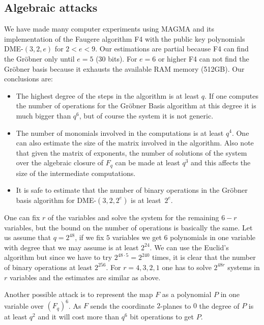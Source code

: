 \documentclass[12pt,a4paper]{amsart}
\theoremstyle{remark}
\theoremstyle{definition}
\begin{document}
\subsection*{Algebraic attacks}

We have made many computer experiments using MAGMA and its implementation of the Faugere algorithm F4 with the public key polynomials 
DME-$(3,2,e)$ for $2<e<9$. Our estimations are partial because F4 can find the Gr\"obner only until $e=5$ (30 bits). For $e=6$ or higher 
F4 can not find the Gr\"obner basis because it exhausts the available RAM memory (512GB). Our conclusions are:

\begin{itemize}
 \item The highest degree of the steps in the algorithm is at least $q$. If one computes the number of operations for 
 the Gr\"obner Basis algorithm at this degree it is much bigger than $q^6$, but of course the system it is not generic.
 \item The number of monomials involved in the computations is at least $q^4$. One can also estimate the size of the matrix involved 
 in the algorithm. Also note that given the matrix of exponents, the number of solutions of the system over the algebraic closure of 
 $F_q$ can be made at least $q^3$ and this affects the size of the intermediate computations. 
 \item It is safe to estimate that the number of binary operations in the Gr\"obner basis algorithm for DME-$(3,2,2^e)$ is at least~$2^e$. 
\end{itemize}

One can fix $r$ of the variables and solve the system for the remaining $6-r$ variables, but the bound on the number of operations is 
basically the same. Let us assume that $q=2^{48}$, if we fix $5$ variables we get 6 polynomials in one variable with degree that we may 
assume is at least $2^{24}$. We can use the Euclid's algorithm but since we have to try $2^{48\cdot 5}=2^{240}$ times, it is clear that the 
number of binary operations at least $2^{256}.$
For $r=4,3,2,1$ one has to solve $2^{48r}$ systems in $r$ variables and the estimates are similar as above.

Another possible attack is to represent the map $F$ as a  polynomial $P$ in one variable over $(F_q)^6$. 
As $F$ sends the coordinate $2$-planes to $0$ the degree of $P$ is at least $q^2$ and it will cost more than 
$q^6$ bit operations to get $P.$
\end{document}
